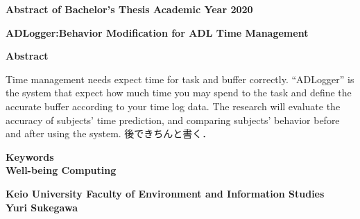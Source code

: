 \begin{center}
\textbf{\large Abstract of Bachelor's Thesis Academic Year 2020}

\vspace{6mm}

\textbf{\large ADLogger:Behavior Modification for ADL Time Management}
\end{center}

\vspace{10mm}


\begin{flushleft}
\textbf{Abstract}\\
\end{flushleft}

Time management needs expect time for task and buffer correctly. “ADLogger” is the system that expect how much time you may spend to the task and define the accurate buffer according to your time log data. The research will evaluate the accuracy of subjects’ time prediction, and comparing subjects’ behavior before and after using the system.
後できちんと書く．

\begin{flushleft}
\textbf{Keywords}\\
\textbf{Well-being Computing}
\end{flushleft}

\begin{flushright}
\textbf{Keio University Faculty of Environment and Information Studies}\\
\textbf{Yuri Sukegawa}\\
\end{flushright}